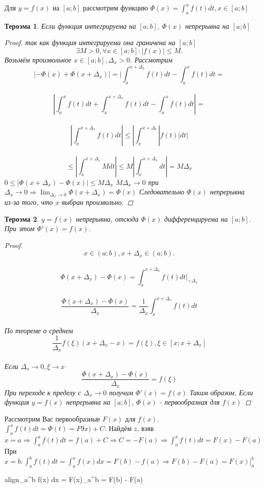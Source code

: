 \documentclass[oneside]{book}
\newcommand{\boxedeq}[2]{\begin{empheq}[box={\fboxsep=6pt\fbox}]{align}\label{#1}#2\end{empheq}}
\newtheorem{thm}{Тероэма}[chapter] %
\begin{document}
\begin{enumerate}
\begin{itemize}
\begin{enumerate}
Для $y = f(x)$ на $[a;b]$ рассмотрим функцию $\Phi(x) = \int_{a}^x f(t) dt, x \in [a;b]$
\begin{thm}
  Если функция интегрируема на $[a;b]$, $\Phi(x)$ непрерывна на $[a;b]$
  \begin{proof}
    так как функция интегрируема она граничена на $[a;b]$ $$
      \exists M > 0, \forall x \in [a;b]: |f(x)| \leq M.
    $$
    Возьмём произвольное $x \in [a;b], \Delta_x > 0$.
    Рассмотрим $$
      |-\Phi(x) + \Phi(x+\Delta_x)| = |\int_{a}^{x+\Delta_x} f(t) dt - \int_{a}^x f(t) dt = $$\\$$
      |\int_{a}^x f(t) dt + \int_{x}^{x+\Delta_x} f(t) dt - \int_{a}^x f(t) dt| = $$\\$$
      |\int_{x}^{x+\Delta_x} f(t) dt| \leq |\int_{x}^{x+\Delta_t} |f(t)| dt| $$\\$$
      \leq |\int_{x}^{x+\Delta_x} M dt| \leq M|\int_{x}^{x+\Delta_x} dt| = M\Delta_x
      $$ $ 0 \leq |\Phi(x+\Delta_x) - \Phi(x)| \leq M\Delta_x $
      $M\Delta_x \rightarrow 0 $ при $ \Delta_x \rightarrow 0 \Rightarrow \lim_{\Delta_x \rightarrow 0}{\Phi(x+\Delta_x)} = \Phi(x)$
      Следовательно $\Phi(x)$ непрерывна из-за того, что $x$ выбран произвольно.
  \end{proof}
\end{thm}
\begin{thm}
  $y = f(x)$ непрерывна, отсюда $\Phi(x)$ дифференцируема на $[a;b]$. При этом $\Phi'(x) = f(x)$.
  \begin{proof}
    $$
      x \in (a;b), x + \Delta_x \in (a;b). $$\\$$
      \Phi (x+\Delta_x) - \Phi(x) = \int_{x}^{x+\Delta_x} f(t) dt \vert_{\div \Delta_x}$$\\$$
      \frac{\Phi(x+\Delta_x) - \Phi(x)}{\Delta_x} = \frac{1}{\Delta_x}\int_{x}^{x+\Delta_x} f(t) dt$$\\
    По теореме о среднем $$
      \frac{1}{\Delta_x}f(\xi)(x+\Delta_x - x) = f(\xi), \xi \in [x; x+\Delta_x]$$\\
      Если $\Delta_x \rightarrow 0, \xi \rightarrow x$ $$
        \frac{\Phi(x+\Delta_x) - \Phi(x)}{\Delta_x} = f(\xi)
      $$ При переходе к пределу с $\Delta_x \rightarrow 0$ получим $\Phi'(x) = f(x)$
      Таким образом, Если функция $y = f(x)$ непрерывна на $[a;b]$, $\Phi(x)$ - первообразная для $f(x)$
  \end{proof}
\end{thm}
Рассмотрим Вас первообразные $F(x)$ для $f(x)$. $\int_{a}^x f(t) dt = \Phi(t) = F9x)+C$.
Найдём $z$, взяв $x = a \Rightarrow \int_{a}^a f(t) dt = f(a)+C \Rightarrow C = -F(a) \Rightarrow \int_{a}^x f(t) dt = F(x) - F(a)$ \\
При $x = b: \int_{a}^b f(t) dt = \int_{a}^x f(x) dx = F(b) - f(a) \Rightarrow F(b) - F(a) = F(x)\vert_{a}^{b}$
\boxedeq{eq:*}{\int_{a}^b f(x) dx = F(x)\vert_{a}^{b} = F(b) - F(a)}


\end{enumerate}
\end{itemize}
\end{enumerate}
\end{document}
